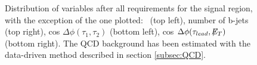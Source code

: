  \begin{figure}[H]
 \begin{center}
 \captionsetup[subfloat]{farskip=0pt,captionskip=0.0cm,labelformat=empty}
 \end{center}
 \caption{Distribution of variables after all requirements for the signal region, with the exception of the
one plotted: \MET~(top left), number of b-jets (top right), cos $\Delta \phi (\tau_{1},\tau_{2})$ (bottom left), 
cos $\Delta \phi (\tau_{lead}, \not\!\!E_T)$ (bottom right). The QCD background has been estimated with 
the data-driven method described in section \ref{subsec:QCD}.}
\label{nminusone} 
 \end{figure}

